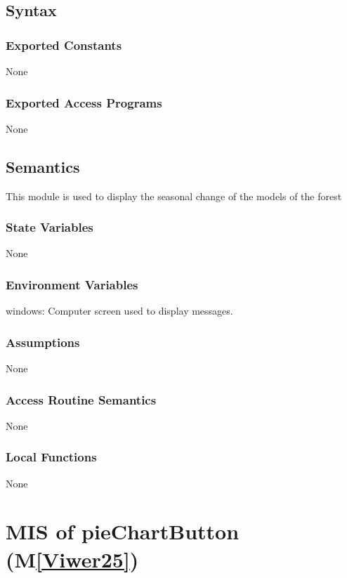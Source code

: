 \documentclass[12pt, titlepage]{article}
\newcommand{\mref}[1]{M\ref{#1}}
\begin{document}
\subsection{Syntax}

\subsubsection{Exported Constants}
None
\subsubsection{Exported Access Programs}
None

\subsection{Semantics}
This module is used to display the seasonal change of the models of the forest

\subsubsection{State Variables}
None

\subsubsection{Environment Variables}

windows: Computer screen used to display messages.

\subsubsection{Assumptions}

None

\subsubsection{Access Routine Semantics}
None

\subsubsection{Local Functions}
None

\newpage

\section{MIS of pieChartButton (\mref{Viwer25})} 
\end{document}
